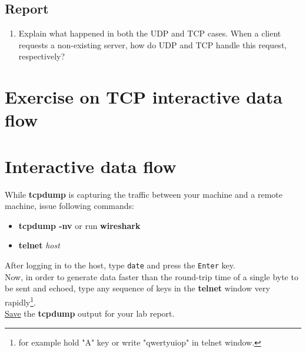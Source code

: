 \documentclass[10pt,a4paper]{article}
\numberwithin{equation}{section}
\numberwithin{figure}{section}
\numberwithin{table}{section}
\begin{document}
    \subsection*{Report}
    \begin{enumerate}
        \item Explain what happened in both the UDP and TCP cases. When a client requests a non-existing server, how do UDP and TCP handle this request, respectively?
    \end{enumerate}

\section*{Exercise on TCP interactive data flow}
\section{Interactive data flow}
While \textbf{tcpdump} is capturing the traffic between your machine and a remote machine, issue following commands:
    \begin{itemize}
        \item \textbf{tcpdump -nv} or run \textbf{wireshark}
        \item \textbf{telnet} \textit{host}
    \end{itemize}
    After logging in to the host, type \texttt{date} and press the \texttt{Enter} key. \\
    Now, in order to generate data faster than the round-trip time of a single byte to be sent and echoed, type any sequence of keys in the \textbf{telnet} window very rapidly\footnote{for example hold "A" key or write "qwertyuiop" in telnet window.}. \\
    \underline{Save} the \textbf{tcpdump} output for your lab report.
\end{document}
